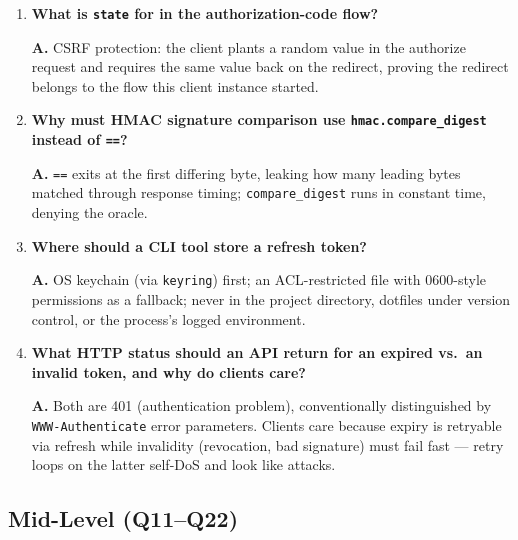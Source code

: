 \begin{enumerate}[label=\textbf{Q\arabic*.}, leftmargin=1.7cm, itemsep=0.9em]
        authorization determines what you may do (OAuth scopes on an access
        token). OAuth~2.0 alone is a delegation/authorization framework ---
        that is why OIDC was layered on top.
  \item \textbf{What is \texttt{state} for in the authorization-code
        flow?}\par
        \textbf{A.} CSRF protection: the client plants a random value in the
        authorize request and requires the same value back on the redirect,
        proving the redirect belongs to the flow this client instance
        started.
  \item \textbf{Why must HMAC signature comparison use
        \texttt{hmac.compare\_digest} instead of \texttt{==}?}\par
        \textbf{A.} \texttt{==} exits at the first differing byte, leaking
        how many leading bytes matched through response timing;
        \texttt{compare\_digest} runs in constant time, denying the oracle.
  \item \textbf{Where should a CLI tool store a refresh token?}\par
        \textbf{A.} OS keychain (via \texttt{keyring}) first; an
        ACL-restricted file with 0600-style permissions as a fallback; never
        in the project directory, dotfiles under version control, or the
        process's logged environment.
  \item \textbf{What HTTP status should an API return for an expired vs.\
        an invalid token, and why do clients care?}\par
        \textbf{A.} Both are 401 (authentication problem), conventionally
        distinguished by \texttt{WWW-Authenticate} error parameters. Clients
        care because expiry is retryable via refresh while invalidity
        (revocation, bad signature) must fail fast --- retry loops on the
        latter self-DoS and look like attacks.
\end{enumerate}

\subsection*{Mid-Level (Q11--Q22)}

